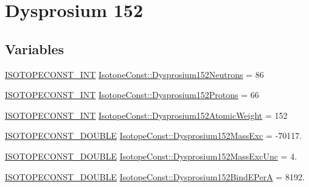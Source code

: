 \hypertarget{group___isotope_const-_dysprosium-_dy152}{}\section{Dysprosium 152}
\label{group___isotope_const-_dysprosium-_dy152}
\subsection*{Variables}
\begin{DoxyCompactItemize}
\item 
\mbox{\hyperlink{group___isotope_const-_macros_ga5f18360b3e99483a35c32d789e62621c}{I\+S\+O\+T\+O\+P\+E\+C\+O\+N\+S\+T\+\_\+\+I\+NT}} \mbox{\hyperlink{group___isotope_const-_dysprosium-_dy152_gada020c51c126c7753471b80674bd50eb}{Isotope\+Const\+::\+Dysprosium152\+Neutrons}} = 86
\item 
\mbox{\hyperlink{group___isotope_const-_macros_ga5f18360b3e99483a35c32d789e62621c}{I\+S\+O\+T\+O\+P\+E\+C\+O\+N\+S\+T\+\_\+\+I\+NT}} \mbox{\hyperlink{group___isotope_const-_dysprosium-_dy152_gae93ecafbe7f8bf049733d9a15eeed81f}{Isotope\+Const\+::\+Dysprosium152\+Protons}} = 66
\item 
\mbox{\hyperlink{group___isotope_const-_macros_ga5f18360b3e99483a35c32d789e62621c}{I\+S\+O\+T\+O\+P\+E\+C\+O\+N\+S\+T\+\_\+\+I\+NT}} \mbox{\hyperlink{group___isotope_const-_dysprosium-_dy152_ga43134390d98ba95ff06ce8411183793e}{Isotope\+Const\+::\+Dysprosium152\+Atomic\+Weight}} = 152
\item 
\mbox{\hyperlink{group___isotope_const-_macros_ga8f45a7272ce02c0b4c65c44636ed719a}{I\+S\+O\+T\+O\+P\+E\+C\+O\+N\+S\+T\+\_\+\+D\+O\+U\+B\+LE}} \mbox{\hyperlink{group___isotope_const-_dysprosium-_dy152_gaeeb452b8aa66a3365fb9bd7bea06f0d3}{Isotope\+Const\+::\+Dysprosium152\+Mass\+Exc}} = -\/70117.
\item 
\mbox{\hyperlink{group___isotope_const-_macros_ga8f45a7272ce02c0b4c65c44636ed719a}{I\+S\+O\+T\+O\+P\+E\+C\+O\+N\+S\+T\+\_\+\+D\+O\+U\+B\+LE}} \mbox{\hyperlink{group___isotope_const-_dysprosium-_dy152_gad7e596469e012805a3c81e3d5e958da5}{Isotope\+Const\+::\+Dysprosium152\+Mass\+Exc\+Unc}} = 4.
\item 
\mbox{\hyperlink{group___isotope_const-_macros_ga8f45a7272ce02c0b4c65c44636ed719a}{I\+S\+O\+T\+O\+P\+E\+C\+O\+N\+S\+T\+\_\+\+D\+O\+U\+B\+LE}} \mbox{\hyperlink{group___isotope_const-_dysprosium-_dy152_gad1ff6559a789fcc663158f878e7863b1}{Isotope\+Const\+::\+Dysprosium152\+Bind\+E\+PerA}} = 8192.

\end{DoxyCompactItemize}
